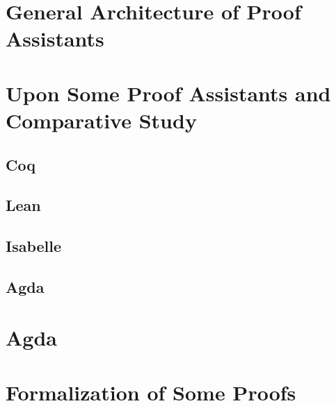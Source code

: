 \documentclass[12pt]{article}
\begin{document}
\section{General Architecture of Proof Assistants}

\section{Upon Some Proof Assistants and Comparative Study}
\subsection{Coq}

\subsection{Lean}

\subsection{Isabelle}

\subsection{Agda}


\section{ Agda}


\section{Formalization of Some Proofs}


 

\end{document}
